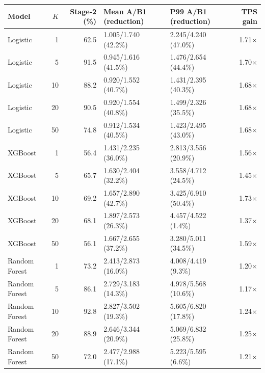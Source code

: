 \begin{tabular*}{\linewidth}{@{\extracolsep{\fill}}l r r l l r@{}}
\toprule
Model & $K$ & Stage-2 (\%) & Mean A/B1 (reduction) & P99 A/B1 (reduction) & TPS gain \\
\midrule
Logistic & 1 & 62.5 & 1.005/1.740 (42.2\%) & 2.245/4.240 (47.0\%) & 1.71$\times$ \\
Logistic & 5 & 91.5 & 0.945/1.616 (41.5\%) & 1.476/2.654 (44.4\%) & 1.70$\times$ \\
Logistic & 10 & 88.2 & 0.920/1.552 (40.7\%) & 1.431/2.395 (40.3\%) & 1.68$\times$ \\
Logistic & 20 & 90.5 & 0.920/1.554 (40.8\%) & 1.499/2.326 (35.5\%) & 1.68$\times$ \\
Logistic & 50 & 74.8 & 0.912/1.534 (40.5\%) & 1.423/2.495 (43.0\%) & 1.68$\times$ \\
XGBoost & 1 & 56.4 & 1.431/2.235 (36.0\%) & 2.813/3.556 (20.9\%) & 1.56$\times$ \\
XGBoost & 5 & 65.7 & 1.630/2.404 (32.2\%) & 3.558/4.712 (24.5\%) & 1.45$\times$ \\
XGBoost & 10 & 69.2 & 1.657/2.890 (42.7\%) & 3.425/6.910 (50.4\%) & 1.73$\times$ \\
XGBoost & 20 & 68.1 & 1.897/2.573 (26.3\%) & 4.457/4.522 (1.4\%) & 1.37$\times$ \\
XGBoost & 50 & 56.1 & 1.667/2.655 (37.2\%) & 3.280/5.011 (34.5\%) & 1.59$\times$ \\
Random Forest & 1 & 73.2 & 2.413/2.873 (16.0\%) & 4.008/4.419 (9.3\%) & 1.20$\times$ \\
Random Forest & 5 & 86.1 & 2.729/3.183 (14.3\%) & 4.978/5.568 (10.6\%) & 1.17$\times$ \\
Random Forest & 10 & 92.8 & 2.827/3.502 (19.3\%) & 5.605/6.820 (17.8\%) & 1.24$\times$ \\
Random Forest & 20 & 88.9 & 2.646/3.344 (20.9\%) & 5.069/6.832 (25.8\%) & 1.25$\times$ \\
Random Forest & 50 & 72.0 & 2.477/2.988 (17.1\%) & 5.223/5.595 (6.6\%) & 1.21$\times$ \\
\bottomrule
\end{tabular*}